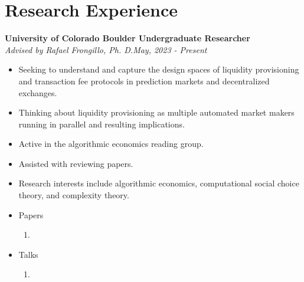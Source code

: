 \documentclass[a4paper,20pt]{article}
\begin{document}
    \section{Research Experience}
    \textbf{University of Colorado Boulder \hfill{Undergraduate Researcher}} \\
    \emph{Advised by Rafael Frongillo, Ph. D.}\hfill{\textit{May, 2023 - Present}}
    \\
    \begin{itemize}[label=-]
      \vspace{-5pt}
      \item Seeking to understand and capture the design spaces of liquidity provisioning and transaction fee protocols in prediction markets and decentralized exchanges.
      \vspace{-5pt}
      \item Thinking about liquidity provisioning as multiple automated market makers running in parallel and resulting implications.
      \vspace{-5pt}
      \item Active in the algorithmic economics reading group.
      \vspace{-5pt}
      \item Assisted with reviewing papers.
      \vspace{-5pt}
      \item Research interests include algorithmic economics, computational social choice theory, and complexity theory.
    \end{itemize}
    \begin{itemize}
      \item Papers
      \begin{enumerate}
        \item {}
      \end{enumerate}
      \item Talks
      \begin{enumerate}
        \item {}
      \end{enumerate}
    \end{itemize}
\end{document}
